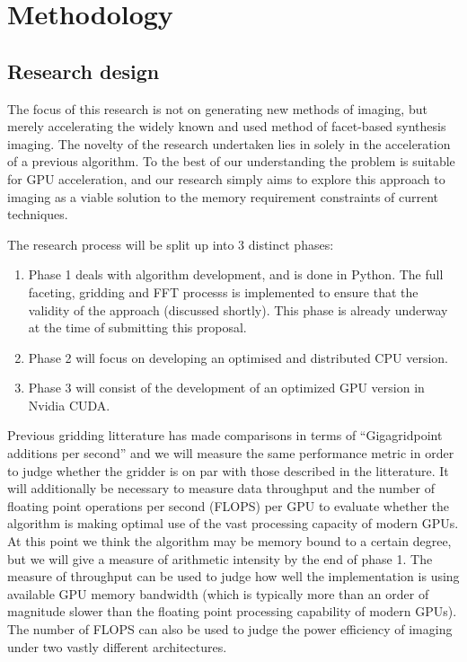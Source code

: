 \documentclass[a4paper, two column]{article}
\begin{document}
\section{Methodology}
\subsection{Research design}
The focus of this research is not on generating new methods of imaging, but merely accelerating the widely known and used method of facet-based synthesis imaging. The novelty of the research undertaken lies in solely in the acceleration
of a previous algorithm. To the best of our understanding the problem is suitable for GPU acceleration, and our research simply aims to explore this approach to imaging as a viable solution to the memory requirement constraints of current techniques.

The research process will be split up into 3 distinct phases:
\begin{enumerate}
 \item Phase 1 deals with algorithm development, and is done in Python. The full faceting, gridding and FFT processs is implemented to ensure that the validity of the approach (discussed shortly). This phase is already underway at the time of
       submitting this proposal.
 \item Phase 2 will focus on developing an optimised and distributed CPU version.
 \item Phase 3 will consist of the development of an optimized GPU version in Nvidia CUDA.
\end{enumerate}

Previous gridding litterature \cite{muscat2014high,romein2012efficient} has made comparisons in terms of ``Gigagridpoint additions per second'' and we will measure the same performance metric in order to judge whether the gridder is on par with those described in the litterature. It 
will additionally be necessary to measure data throughput and the number of floating point operations per second (FLOPS) per GPU to evaluate whether the algorithm is making optimal use of the vast processing capacity of modern GPUs. At this point we think the algorithm may be memory bound
to a certain degree, but we will give a measure of arithmetic intensity by the end of phase 1. The measure of throughput can be used to judge how well the implementation is using available GPU memory bandwidth (which is typically more than an order of magnitude slower than the floating point
processing capability of modern GPUs). The number of FLOPS can also be used to judge the power efficiency of imaging under two vastly different architectures.
\end{document}
